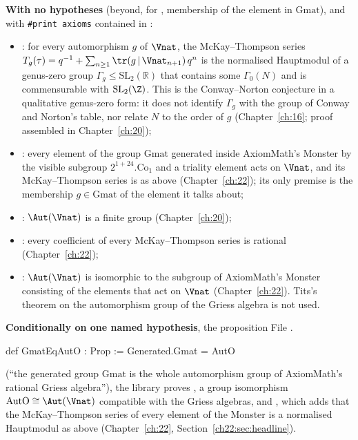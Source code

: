 \textbf{With no hypotheses} (beyond, for , membership of the element in $\mathrm{Gmat}$), and with \texttt{\#print axioms} contained in :
\begin{itemize}
\item {}: for every automorphism $g$ of $\Vnat$, the McKay--Thompson series
  $T_g(\tau)=q^{-1}+\sum_{n\ge1}\tr(g\,|\,\Vnat_{n+1})\,q^n$ is the normalised Hauptmodul of a genus-zero group
  $\Gamma_g\le\mathrm{SL}_2(\mathbb R)$ that contains some $\Gamma_0(N)$ and is commensurable with
  $\mathrm{SL}_2(\Z)$. This is the Conway--Norton conjecture in a qualitative genus-zero form: it does not identify
  $\Gamma_g$ with the group of Conway and Norton's table, nor relate $N$ to the order of $g$
  (Chapter~\ref{ch:16}; proof assembled in Chapter~\ref{ch:20});
\item {}: every element of the group $\mathrm{Gmat}$ generated inside AxiomMath's Monster by the
  visible subgroup $2^{1+24}.\mathrm{Co}_1$ and a triality element acts on $\Vnat$, and its McKay--Thompson series is as
  above (Chapter~\ref{ch:22}); its only premise is the membership $g\in\mathrm{Gmat}$ of the element it talks about;
\item {}: $\Aut(\Vnat)$ is a finite group (Chapter~\ref{ch:20});
\item {}: every coefficient of every McKay--Thompson series is rational (Chapter~\ref{ch:22});
\item {}: $\Aut(\Vnat)$ is isomorphic to the subgroup of AxiomMath's Monster
   consisting of the elements that act on $\Vnat$ (Chapter~\ref{ch:22}). Tits's theorem on the automorphism
  group of the Griess algebra is not used.
\end{itemize}

\textbf{Conditionally on one named hypothesis}, the proposition
\noindent File .
\begin{leancode}
def GmatEqAutO : Prop :=
  Generated.Gmat = AutO
\end{leancode}
(``the generated group $\mathrm{Gmat}$ is the whole automorphism group  of AxiomMath's rational Griess
algebra''), the library proves , a group isomorphism
$\mathrm{AutO}\cong\Aut(\Vnat)$ compatible with the Griess algebras, and ,
which adds that the McKay--Thompson series of every element of the Monster is a normalised Hauptmodul as above
(Chapter~\ref{ch:22}, Section~\ref{ch22:sec:headline}).

